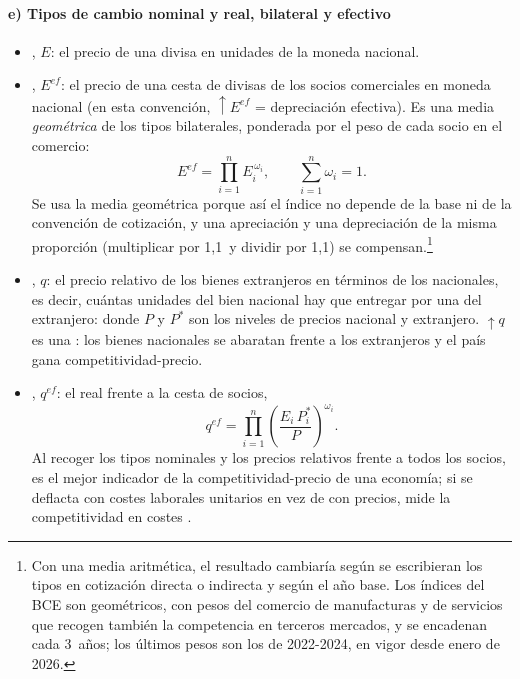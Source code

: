 \documentclass[11pt]{article}
\begin{document}
\paragraph{e) Tipos de cambio nominal y real, bilateral y efectivo}\label{sec:tipos-cambio}

\begin{itemize}
\item {}, $E$: el precio de una divisa en unidades de la moneda nacional.
\item {}, $E^{ef}$: el precio de una cesta de divisas de los socios comerciales en moneda nacional (en esta convención, $\uparrow E^{ef}$ = depreciación efectiva). Es una media \emph{geométrica} de los tipos bilaterales, ponderada por el peso de cada socio en el comercio:
  \begin{equation}\label{eq:tipo-efectivo}
  E^{ef}=\prod_{i=1}^{n}E_i^{\,\omega_i},\qquad \sum_{i=1}^{n}\omega_i=1 .
  \end{equation}
  Se usa la media geométrica porque así el índice no depende de la base ni de la convención de cotización, y una apreciación y una depreciación de la misma proporción (multiplicar por 1,1~y dividir por 1,1) se compensan.\footnote{Con una media aritmética, el resultado cambiaría según se escribieran los tipos en cotización directa o indirecta y según el año base. Los índices del BCE son geométricos, con pesos del comercio de manufacturas y de servicios que recogen también la competencia en terceros mercados, y se encadenan cada 3~años; los últimos pesos son los de 2022-2024, en vigor desde enero de 2026\nocite{BCE2026TCEMetodo}.}
\item {}, $q$: el precio relativo de los bienes extranjeros en términos de los nacionales, es decir, cuántas unidades del bien nacional hay que entregar por una del extranjero:
  donde $P$ y $P^{*}$ son los niveles de precios nacional y extranjero. $\uparrow q$ es una : los bienes nacionales se abaratan frente a los extranjeros y el país gana competitividad-precio.
\item {}, $q^{ef}$: el real frente a la cesta de socios,
  \begin{equation}\label{eq:tipo-efectivo-real}
  q^{ef}=\prod_{i=1}^{n}\left(\frac{E_i\,P^{*}_i}{P}\right)^{\omega_i}.
  \end{equation}
  Al recoger los tipos nominales y los precios relativos frente a todos los socios, es el mejor indicador de la competitividad-precio de una economía; si se deflacta con costes laborales unitarios en vez de con precios, mide la competitividad en costes .

\end{itemize}
\end{document}
